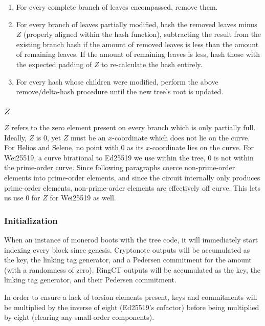 \documentclass[]{article}
\begin{document}
\begin{enumerate}
  \item For every complete branch of leaves encompassed, remove them.
  \item For every branch of leaves partially modified, hash the removed leaves minus $Z$ (properly aligned within the hash function), subtracting the result from the existing branch hash if the amount of removed leaves is less than the amount of remaining leaves. If the amount of remaining leaves is less, hash those with the expected padding of $Z$ to re-calculate the hash entirely.
  \item For every hash whose children were modified, perform the above remove/delta-hash procedure until the new tree's root is updated.
\end{enumerate}

\subsubsection{$Z$}

$Z$ refers to the zero element present on every branch which is only partially full. Ideally, $Z$ is $0$, yet $Z$ must be an $x$-coordinate which does not lie on the curve. For Helios and Selene, no point with $0$ as its $x$-coordinate lies on the curve. For Wei25519, a curve birational to Ed25519 we use within the tree, $0$ is not within the prime-order curve. Since following paragraphs coerce non-prime-order elements into prime-order elements, and since the circuit internally only produces prime-order elements, non-prime-order elements are effectively off curve. This lets us use $0$ for $Z$ for Wei25519 as well.

\subsubsection{Initialization}

When an instance of monerod boots with the tree code, it will immediately start indexing every block since genesis. Cryptonote outputs will be accumulated as the key, the linking tag generator, and a Pedersen commitment for the amount (with a randomness of zero). RingCT outputs will be accumulated as the key, the linking tag generator, and their Pedersen commitment.

In order to ensure a lack of torsion elements present, keys and commitments will be multiplied by the inverse of eight (Ed25519's cofactor) before being multiplied by eight (clearing any small-order components).
\end{document}
